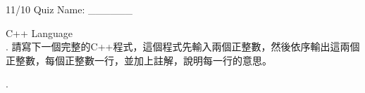 \documentclass{report}
\begin{document}
\begin{center}
    {\Huge 11/10 Quiz Name: \_\_\_\_\_\_}
\end{center}
{\huge C++ Language}\\

. 請寫下一個完整的C++程式，這個程式先輸入兩個正整數，然後依序輸出這兩個正整數，每個正整數一行，並加上註解，說明每一行的意思。

. 
\end{document}
